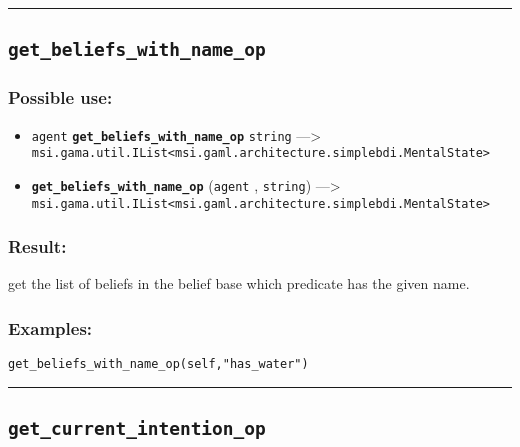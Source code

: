 \documentclass[]{book}
\providecommand{\tightlist}{%
  \setlength{\itemsep}{0pt}\setlength{\parskip}{0pt}}
\theoremstyle{definition}
\theoremstyle{definition}
\theoremstyle{definition}
\theoremstyle{remark}
\begin{document}
\begin{center}\rule{0.5\linewidth}{\linethickness}\end{center}

\subsection{\texorpdfstring{\texttt{get\_beliefs\_with\_name\_op}}{get\_beliefs\_with\_name\_op}}\label{get_beliefs_with_name_op}

\subsubsection{Possible use:}\label{possible-use-200}

\begin{itemize}
\tightlist
\item
  \texttt{agent} \textbf{\texttt{get\_beliefs\_with\_name\_op}}
  \texttt{string} ---\textgreater{}
  \texttt{msi.gama.util.IList\textless{}msi.gaml.architecture.simplebdi.MentalState\textgreater{}}
\item
  \textbf{\texttt{get\_beliefs\_with\_name\_op}} (\texttt{agent} ,
  \texttt{string}) ---\textgreater{}
  \texttt{msi.gama.util.IList\textless{}msi.gaml.architecture.simplebdi.MentalState\textgreater{}}
\end{itemize}

\subsubsection{Result:}\label{result-194}

get the list of beliefs in the belief base which predicate has the given
name.

\subsubsection{Examples:}\label{examples-147}

\begin{verbatim}
get_beliefs_with_name_op(self,"has_water") 
\end{verbatim}

\begin{center}\rule{0.5\linewidth}{\linethickness}\end{center}

\subsection{\texorpdfstring{\texttt{get\_current\_intention\_op}}{get\_current\_intention\_op}}\label{get_current_intention_op}
\end{document}
